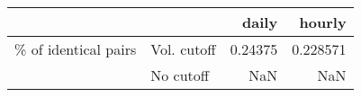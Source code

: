 \begin{tabular}{llrr}
\toprule
                      &           &    daily &    hourly \\
\midrule
\% of identical pairs & Vol. cutoff &  0.24375 &  0.228571 \\
                      & No cutoff &      NaN &       NaN \\
\bottomrule
\end{tabular}

